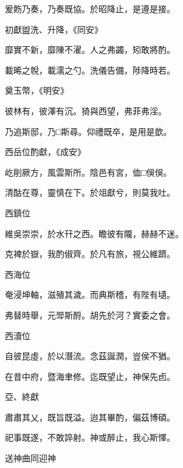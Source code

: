\begin{pinyinscope}
 爰飭乃奏，乃奏既協。於昭降止，是遵是接。



 初獻盥洗、升降，《同安》



 靡實不新，靡陳不濯。人之弗蠲，矧敢將酌。



 載晞之帨，載濡之勺。洗儀告備，陟降時若。



 奠玉幣，《明安》



 彼林有，彼澤有沉。猗與西望，弗菲弗淫。



 乃追斯邸，乃□斯尋。仰禮既卒，是用是歆。



 西岳位酌獻，《成安》



 屹削厥方，風雲斯所。陰邑有宮，侐□俁俁。



 清酤在尊，靈慎在下。於俎獻兮，則莫我吐。



 西鎮位



 維吳崇崇，於水幵之西。瞻彼有隴，赫赫不迷。



 克裨於嶽，我酌俶齊。於凡有旅，視公維躋。



 西海位



 奄浸坤軸，滋殖其濊。而典斯稽，有陛有壝。



 弗替時舉，元斝斯酹。胡先於河？實委之會。



 西瀆位



 自彼昆虛，於以潛流。念茲誕潤，豈侯不猶。



 在昔中府，暨海聿修。迄既望止，神保先卣。



 亞、終獻



 肅肅其乂，既旨既溢。迨其畢酌，偏茲博碩。



 祀事既遂，不敢誶射。神或醉止，我心斯懌。



 送神曲同迎神




\end{pinyinscope}
